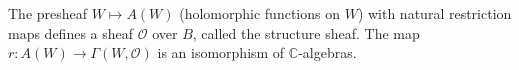 The presheaf $W \mapsto A(W)$ (holomorphic functions on $W$) with natural restriction maps defines a sheaf $\mathcal{O}$ over $B$, called the structure sheaf. The map $r: A(W) \to \Gamma(W, \mathcal{O})$ is an isomorphism of $\mathbb{C}$-algebras.
